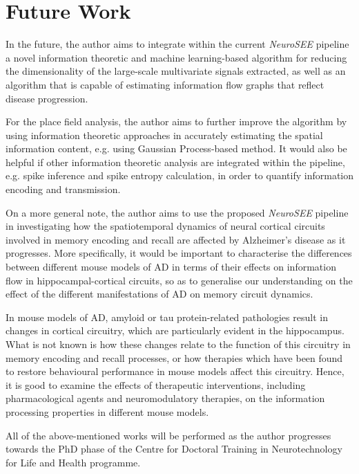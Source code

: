 \chapter{Future Work}

\hspace{\parindent} In the future, the author aims to integrate within the current \textit{NeuroSEE} pipeline a novel information theoretic and machine learning-based algorithm for reducing the dimensionality of the large-scale multivariate signals extracted, as well as an algorithm that is capable of estimating information flow graphs that reflect disease progression. 

For the place field analysis, the author aims to further improve the algorithm by using information theoretic approaches in accurately estimating the spatial information content, e.g. using Gaussian Process-based method. It would also be helpful if other information theoretic analysis are integrated within the pipeline, e.g. spike inference and spike entropy calculation, in order to quantify information encoding and transmission.

On a more general note, the author aims to use the proposed \textit{NeuroSEE} pipeline in investigating how the spatiotemporal dynamics of neural cortical circuits involved in memory encoding and recall are affected by Alzheimer's disease as it progresses. More specifically, it would be important to characterise the differences between different mouse models of AD in terms of their effects on information flow in hippocampal-cortical circuits, so as to generalise our understanding on the effect of the different manifestations of AD on memory circuit dynamics. 

In mouse models of AD, amyloid or tau protein-related pathologies result in changes in cortical circuitry, which are particularly evident in the hippocampus. What is not known is how these changes relate to the function of this circuitry in memory encoding and recall processes, or how therapies which have been found to restore behavioural performance in mouse models affect this circuitry. Hence, it is good to examine the effects of therapeutic interventions, including pharmacological agents and neuromodulatory therapies, on the information processing properties in different mouse models. 

All of the above-mentioned works will be performed as the author progresses towards the PhD phase of the Centre for Doctoral Training in Neurotechnology for Life and Health programme. 